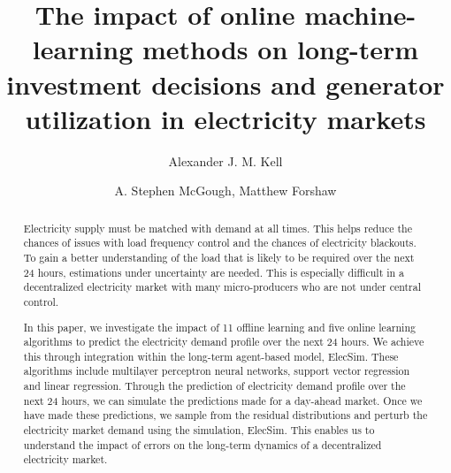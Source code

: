 \documentclass[final,3p,times,twocolumn,numbers]{elsarticle}
\begin{document}
\begin{frontmatter}


 \title{The impact of online machine-learning methods on long-term investment decisions and generator utilization in electricity markets}
 \author{Alexander J. M. Kell}



\author{A. Stephen McGough, Matthew Forshaw}

\address{School of Computing, Newcastle University, Newcastle upon Tyne, United Kingdom}

\begin{abstract}


Electricity supply must be matched with demand at all times. This helps reduce the chances of issues with load frequency control and the chances of electricity blackouts. To gain a better understanding of the load that is likely to be required over the next 24 hours, estimations under uncertainty are needed. This is especially difficult in a decentralized electricity market with many micro-producers who are not under central control. 


In this paper, we investigate the impact of 11 offline learning and five online learning algorithms to predict the electricity demand profile over the next 24 hours. We achieve this through integration within the long-term agent-based model, ElecSim. These algorithms include multilayer perceptron neural networks, support vector regression and linear regression. Through the prediction of electricity demand profile over the next 24 hours, we can simulate the predictions made for a day-ahead market. Once we have made these predictions, we sample from the residual distributions and perturb the electricity market demand using the simulation, ElecSim. This enables us to understand the impact of errors on the long-term dynamics of a decentralized electricity market.
 


\end{abstract}
\end{frontmatter}
\end{document}
